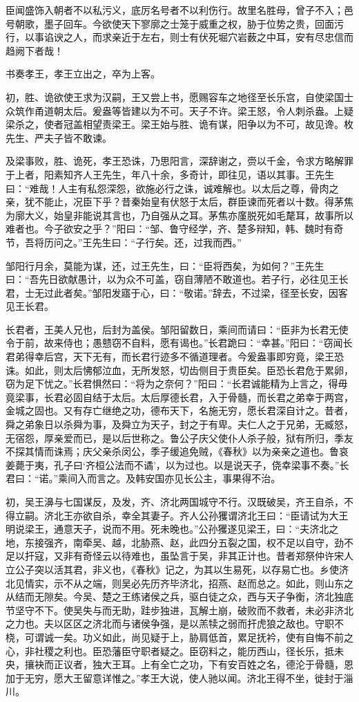 \documentclass[]{article}
\begin{document}
臣闻盛饰入朝者不以私污义，底厉名号者不以利伤行。故里名胜母，曾子不入；邑号朝歌，墨子回车。今欲使天下寥廓之士笼于威重之权，胁于位势之贵，回面污行，以事谄谀之人，而求亲近于左右，则士有伏死堀穴岩薮之中耳，安有尽忠信而趋阙下者哉！

书奏孝王，孝王立出之，卒为上客。

初，胜、诡欲使王求为汉嗣，王又尝上书，愿赐容车之地径至长乐宫，自使梁国士众筑作甬道朝太后。爰盎等皆建以为不可。天子不许。梁王怒，令人刺杀盎。上疑梁杀之，使者冠盖相望责梁王。梁王始与胜、诡有谋，阳争以为不可，故见谗。枚先生、严夫子皆不敢谏。

及梁事败，胜、诡死，孝王恐诛，乃思阳言，深辞谢之，赍以千金，令求方略解罪于上者，阳素知齐人王先生，年八十余，多奇计，即往见，语以其事。王先生曰：``难哉！人主有私怨深怨，欲施必行之诛，诚难解也。以太后之尊，骨肉之亲，犹不能止，况臣下乎？昔秦始皇有伏怒于太后，群臣谏而死者以十数。得茅焦为廓大义，始皇非能说其言也，乃自强从之耳。茅焦亦廑脱死如毛氂耳，故事所以难者也。今子欲安之乎？''阳曰：``邹、鲁守经学，齐、楚多辩知，韩、魏时有奇节，吾将历问之。''王先生曰：``子行矣。还，过我而西。''

邹阳行月余，莫能为谋，还，过王先生，曰：``臣将西矣，为如何？''王先生曰：``吾先日欲献愚计，以为众不可盖，窃自薄陋不敢道也。若子行，必往见王长君，士无过此者矣。''邹阳发寤于心，曰：``敬诺。''辞去，不过梁，径至长安，因客见王长君。

长君者，王美人兄也，后封为盖侯。邹阳留数日，乘间而请曰：``臣非为长君无使令于前，故来侍也；愚戆窃不自料，愿有谒也。''长君跪曰：``幸甚。''阳曰：``窃闻长君弟得幸后宫，天下无有，而长君行迹多不循道理者。今爰盎事即穷竟，梁王恐诛。如此，则太后怫郁泣血，无所发怒，切齿侧目于贵臣矣。臣恐长君危于累卵，窃为足下忧之。''长君惧然曰：``将为之奈何？''阳曰：``长君诚能精为上言之，得毋竟梁事，长君必固自结于太后。太后厚德长君，入于骨髓，而长君之弟幸于两宫，金城之固也。又有存亡继绝之功，德布天下，名施无穷，愿长君深自计之。昔者，舜之弟象日以杀舜为事，及舜立为天子，封之于有卑。夫仁人之于兄弟，无臧怒，无宿怨，厚亲爱而已，是以后世称之。鲁公子庆父使仆人杀子般，狱有所归，季友不探其情而诛焉；庆父亲杀闵公，季子缓追免贼，《春秋》以为亲亲之道也。鲁哀姜薨于夷，孔子曰`齐桓公法而不谲'，以为过也。以是说天子，侥幸梁事不奏。''长君曰：``诺。''乘间入而言之。及韩安国亦见长公主，事果得不治。

初，吴王濞与七国谋反，及发，齐、济北两国城守不行。汉既破吴，齐王自杀，不得立嗣。济北王亦欲自杀，幸全其妻子。齐人公孙玃谓济北王曰：``臣请试为大王明说梁王，通意天子，说而不用。死未晚也。''公孙玃遂见梁王，曰：``夫济北之地，东接强齐，南牵吴、越，北胁燕、赵，此四分五裂之国，权不足以自守，劲不足以扞寇，又非有奇怪云以待难也，虽坠言于吴，非其正计也。昔者郑祭仲许宋人立公子突以活其君，非义也，《春秋》记之，为其以生易死，以存易亡也。乡使济北见情实，示不从之端，则吴必先历齐毕济北，招燕、赵而总之。如此，则山东之从结而无隙矣。今吴、楚之王练诸侯之兵，驱白徒之众，西与天子争衡，济北独底节坚守不下。使吴失与而无助，跬步独进，瓦解土崩，破败而不救者，未必非济北之力也。夫以区区之济北而与诸侯争强，是以羔犊之弱而扞虎狼之敌也。守职不桡，可谓诚一矣。功义如此，尚见疑于上，胁肩低首，累足抚衿，使有自悔不前之心，非社稷之利也。臣恐藩臣守职者疑之。臣窃料之，能历西山，径长乐，抵未央，攘袂而正议者，独大王耳。上有全亡之功，下有安百姓之名，德沦于骨髓，恩加于无穷，愿大王留意详惟之。''孝王大说，使人驰以闻。济北王得不坐，徙封于淄川。
\end{document}
